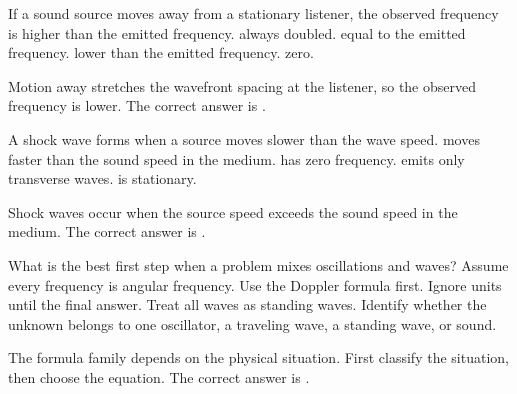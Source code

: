 \documentclass[full,print,11pt,a4paper]{physicsquiz}
\begin{document}
\begin{quizbank}
  \begin{quizquestion}[
    id=ow-doppler-028,
    topic=doppler-effect,
    difficulty=foundation,
    marks=1,
    correct=D,
    tags={doppler,concept},
    outcome={Predict qualitative Doppler shift}
  ]
    If a sound source moves away from a stationary listener, the observed
    frequency is
    \choices
      {higher than the emitted frequency.}
      {always doubled.}
      {equal to the emitted frequency.}
      {lower than the emitted frequency.}
      {zero.}
  \end{quizquestion}
  \begin{quizsolution}
    Motion away stretches the wavefront spacing at the listener, so the observed
    frequency is lower. The correct answer is \quizcorrectletter.
  \end{quizsolution}

  \begin{quizquestion}[
    id=ow-shock-029,
    topic=shock-waves,
    difficulty=foundation,
    marks=1,
    correct=B,
    tags={mach-cone},
    outcome={State the condition for a shock wave}
  ]
    A shock wave forms when a source
    \choices
      {moves slower than the wave speed.}
      {moves faster than the sound speed in the medium.}
      {has zero frequency.}
      {emits only transverse waves.}
      {is stationary.}
  \end{quizquestion}
  \begin{quizsolution}
    Shock waves occur when the source speed exceeds the sound speed in the
    medium. The correct answer is \quizcorrectletter.
  \end{quizsolution}

  \begin{quizquestion}[
    id=ow-summary-030,
    topic=summary,
    difficulty=foundation,
    marks=1,
    correct=E,
    tags={strategy,units},
    outcome={Choose a reliable problem-solving first step}
  ]
    What is the best first step when a problem mixes oscillations and waves?
    \choices
      {Assume every frequency is angular frequency.}
      {Use the Doppler formula first.}
      {Ignore units until the final answer.}
      {Treat all waves as standing waves.}
      {Identify whether the unknown belongs to one oscillator, a traveling wave, a standing wave, or sound.}
  \end{quizquestion}
  \begin{quizsolution}
    The formula family depends on the physical situation. First classify the
    situation, then choose the equation. The correct answer is
    \quizcorrectletter.
  \end{quizsolution}
\end{quizbank}
\end{document}
